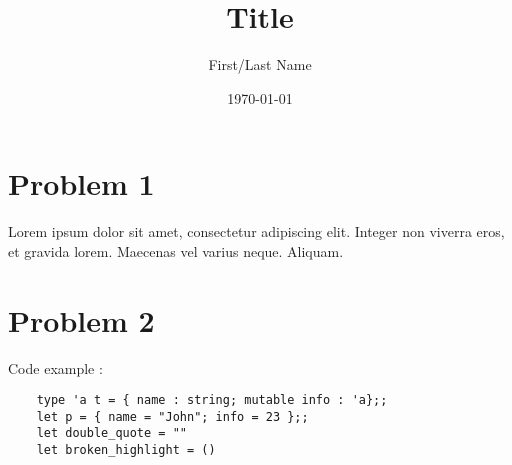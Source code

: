 \documentclass{article}
\title{Title}
\date{\today}
\author{First/Last Name}
\begin{document}
\thispagestyle{firstpage}

\begin{center}
    \huge\bfseries{\@title}
\end{center}

\section{Problem 1}

Lorem ipsum dolor sit amet, consectetur adipiscing elit. Integer non viverra 
eros, et gravida lorem. Maecenas vel varius neque. Aliquam.

\section{Problem 2}

Code example : 
\begin{verbatim}
    type 'a t = { name : string; mutable info : 'a};;
    let p = { name = "John"; info = 23 };;
    let double_quote = ""
    let broken_highlight = ()
\end{verbatim}
\end{document}
